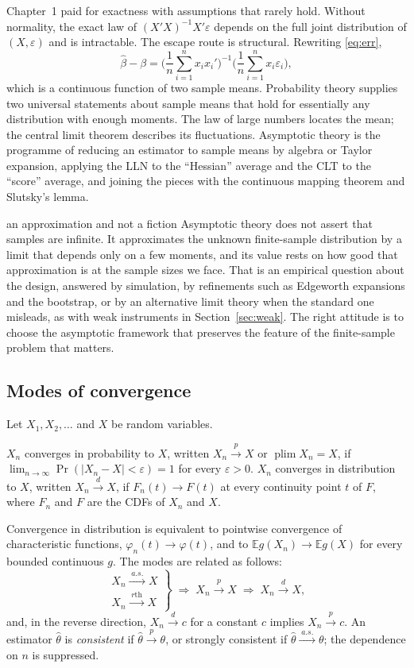 \documentclass[11pt,a4paper]{article}
\newcommand{\E}{\mathbb{E}}
\newcommand{\plim}{\operatorname*{plim}}
\newcommand{\cp}{\xrightarrow{\;p\;}}
\newcommand{\cd}{\xrightarrow{\;d\;}}
\newcommand{\cas}{\xrightarrow{\;a.s.\;}}
\newcommand{\bh}{\hat\beta}
\begin{document}
Chapter~1 paid for exactness with assumptions that rarely hold. Without normality, the exact law of $(X'X)^{-1}X'\varepsilon$ depends on the full joint distribution of $(X,\varepsilon)$ and is intractable. The escape route is structural. Rewriting \eqref{eq:err},
\[
\bh-\beta = \Big(\frac1n\sum_{i=1}^nx_ix_i'\Big)^{-1}\Big(\frac1n\sum_{i=1}^nx_i\varepsilon_i\Big),
\]
which is a continuous function of two sample means. Probability theory supplies two universal statements about sample means that hold for essentially any distribution with enough moments. The law of large numbers locates the mean; the central limit theorem describes its fluctuations. Asymptotic theory is the programme of reducing an estimator to sample means by algebra or Taylor expansion, applying the LLN to the ``Hessian'' average and the CLT to the ``score'' average, and joining the pieces with the continuous mapping theorem and Slutsky's lemma.

\begin{whybox}{an approximation and not a fiction}
Asymptotic theory does not assert that samples are infinite. It approximates the unknown finite-sample distribution by a limit that depends only on a few moments, and its value rests on how good that approximation is at the sample sizes we face. That is an empirical question about the design, answered by simulation, by refinements such as Edgeworth expansions and the bootstrap, or by an alternative limit theory when the standard one misleads, as with weak instruments in Section~\ref{sec:weak}. The right attitude is to choose the asymptotic framework that preserves the feature of the finite-sample problem that matters.
\end{whybox}

\subsection{Modes of convergence}

Let $X_1,X_2,\dots$ and $X$ be random variables.

\begin{definition}
$X_n$ converges in probability to $X$, written $X_n\cp X$ or $\plim X_n=X$, if $\lim_{n\to\infty}\Pr(|X_n-X|<\varepsilon)=1$ for every $\varepsilon>0$. $X_n$ converges in distribution to $X$, written $X_n\cd X$, if $F_n(t)\to F(t)$ at every continuity point $t$ of $F$, where $F_n$ and $F$ are the CDFs of $X_n$ and $X$.
\end{definition}

Convergence in distribution is equivalent to pointwise convergence of characteristic functions, $\varphi_n(t)\to\varphi(t)$, and to $\E g(X_n)\to\E g(X)$ for every bounded continuous $g$. The modes are related as follows:
\[
\left.\begin{array}{r}X_n\cas X\\[2pt] X_n\xrightarrow{\;r\text{th}\;}X\end{array}\right\}\;\Longrightarrow\;X_n\cp X\;\Longrightarrow\;X_n\cd X,
\]
and, in the reverse direction, $X_n\cd c$ for a constant $c$ implies $X_n\cp c$. An estimator $\hat\theta$ is \emph{consistent} if $\hat\theta\cp\theta$, or strongly consistent if $\hat\theta\cas\theta$; the dependence on $n$ is suppressed.
\end{document}
